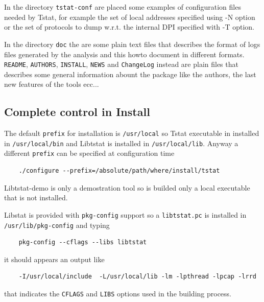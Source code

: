 \documentclass[11pt]{article}
\begin{document}
In the directory \texttt{tstat-conf} are placed some examples of configuration files 
needed by Tstat, for example the set of local addresses specified using -N option
or the set of protocols to dump w.r.t. the internal DPI specified with -T option.



In the directory \texttt{doc} the are some plain text files that describes the format
of logs files generated by the analysis and this howto document in different formats.
\texttt{README}, \texttt{AUTHORS}, \texttt{INSTALL}, \texttt{NEWS} and \texttt{ChangeLog} instead are plain files that
describes some general information abount the package like the authors, the last new
features of the tools ecc...

\subsection{Complete control in Install\label{Complete_control_in_Install}}


The default \texttt{prefix} for installation is \texttt{/usr/local} so
Tstat executable in installed in \texttt{/usr/local/bin} and Libtstat 
is installed in \texttt{/usr/local/lib}. Anyway a different \texttt{prefix} can
be specified at configuration time

\begin{small}\begin{verbatim}
    ./configure --prefix=/absolute/path/where/install/tstat
\end{verbatim}\end{small} \noindent
Libtstat-demo is only a demostration tool so is builded only a local
executable that is not installed.



Libstat is provided with \texttt{pkg-config} support so a \texttt{libtstat.pc} is installed in
\texttt{/usr/lib/pkg-config} and typing

\begin{small}\begin{verbatim}
    pkg-config --cflags --libs libtstat
\end{verbatim}\end{small} \noindent
it should appears an output like

\begin{small}\begin{verbatim}
    -I/usr/local/include  -L/usr/local/lib -lm -lpthread -lpcap -lrrd
\end{verbatim}\end{small} \noindent
that indicates the \texttt{CFLAGS} and \texttt{LIBS} options used in the building
process.
\end{document}
